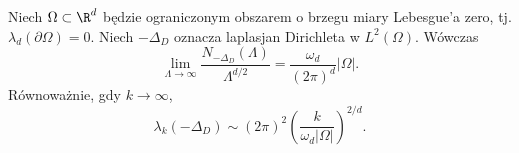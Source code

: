\begin{twierdzenie}
\label{thm:pde18-weyl}
Niech $\Omega\subset\R^d$ będzie ograniczonym obszarem
o brzegu miary Lebesgue'a zero, tj.
$\lambda_d(\partial\Omega)=0$. Niech $-\Delta_D$
oznacza laplasjan Dirichleta w $L^2(\Omega)$.
Wówczas
\begin{equation}\label{eq:pde18-weyl}
 \lim_{\Lambda\to\infty}
 \frac{N_{-\Delta_D}(\Lambda)}{\Lambda^{d/2}}
 =\frac{\omega_d}{(2\pi)^d}|\Omega|.
\end{equation}
Równoważnie, gdy $k\to\infty$,
\begin{equation}\label{eq:pde18-lambda-weyl}
 \lambda_k(-\Delta_D)\sim
 (2\pi)^2\left(\frac{k}{\omega_d|\Omega|}\right)^{2/d}.
\end{equation}
\end{twierdzenie}
